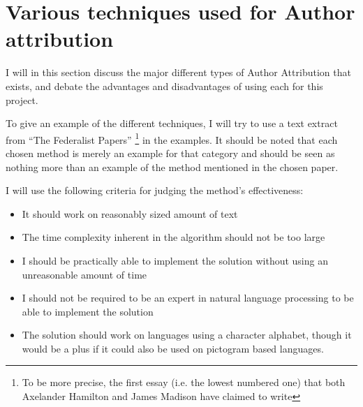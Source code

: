 \section{Various techniques used for Author attribution}
\label{choiceMethod}
I will in this section discuss the major different types of Author Attribution that exists, and debate the advantages and disadvantages of using each for this project.

To give an example of the different techniques, I will try to use a text extract from ``The Federalist Papers'' \cite{federalist} \footnote{To be more precise, the first essay (i.e. the lowest numbered one) that both Axelander Hamilton and James Madison have claimed to write} in the examples. It should be noted that each chosen method is merely an example for that category and should be seen as nothing more than an example of the method mentioned in the chosen paper.

I will use the following criteria for judging the method's effectiveness:
\begin{itemize}
\item It should work on reasonably sized amount of text
\item The time complexity inherent in the algorithm should not be too large
\item I should be practically able to implement the solution without using an unreasonable amount of time
\item I should not be required to be an expert in natural language processing to be able to implement the solution
\item The solution should work on languages using a character alphabet, though it would be a plus if it could also be used on pictogram based languages.
\end{itemize}

